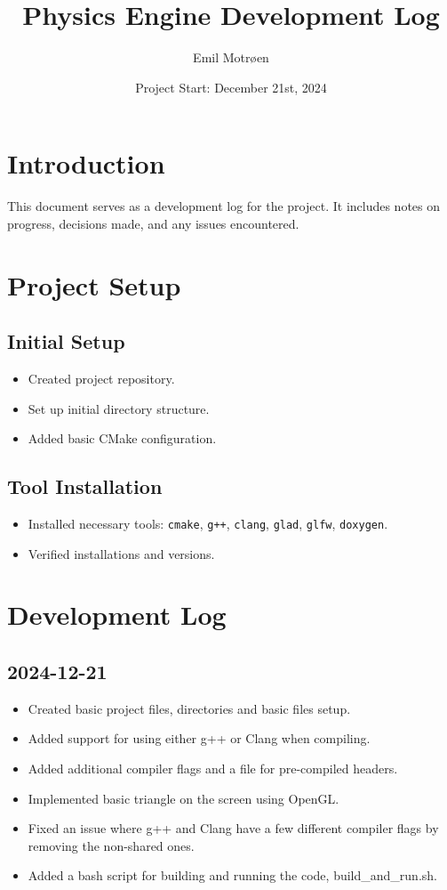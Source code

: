 \documentclass[a4paper,12pt]{article}
\title{Physics Engine Development Log}
\author{Emil Motrøen}
\date{Project Start: December 21st, 2024}
\begin{document}
\maketitle

\tableofcontents
\newpage

\section{Introduction}
This document serves as a development log for the project. It includes notes on progress, decisions made, and any issues encountered.

\section{Project Setup}
\subsection{Initial Setup}
\begin{itemize}
    \item Created project repository.
    \item Set up initial directory structure.
    \item Added basic CMake configuration.
\end{itemize}

\subsection{Tool Installation}
\begin{itemize}
    \item Installed necessary tools: \texttt{cmake}, \texttt{g++}, \texttt{clang}, \texttt{glad}, \texttt{glfw}, \texttt{doxygen}.
    \item Verified installations and versions.
\end{itemize}

\section{Development Log}
\subsection{2024-12-21}
\begin{itemize}
	\item Created basic project files, directories and basic files setup.
	\item Added support for using either g++ or Clang when compiling.
	\item Added additional compiler flags and a file for pre-compiled headers.
	\item Implemented basic triangle on the screen using OpenGL.
	\item Fixed an issue where g++ and Clang have a few different compiler flags by removing the non-shared ones.
	\item Added a bash script for building and running the code, build\_and\_run.sh.
\end{itemize}
\end{document}
